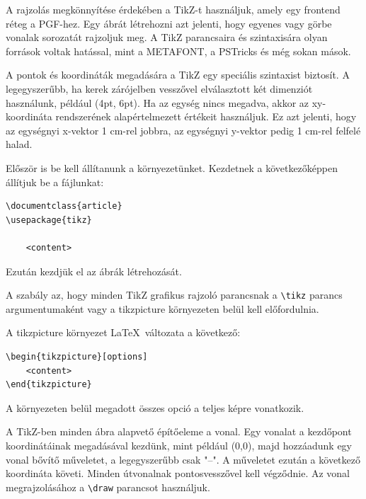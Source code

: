 


A rajzolás megkönnyítése érdekében a TikZ-t használjuk, amely egy frontend réteg a PGF-hez. Egy ábrát létrehozni azt jelenti, hogy egyenes vagy görbe vonalak sorozatát rajzoljuk meg. A TikZ parancsaira és szintaxisára olyan források voltak hatással, mint a METAFONT, a PSTricks és még sokan mások.

\noindent
A pontok és koordináták megadására a TikZ egy speciális szintaxist biztosít. A legegyszerűbb, ha kerek zárójelben vesszővel elválasztott két dimenziót használunk, például (4pt, 6pt). Ha az egység nincs megadva, akkor az xy-koordináta rendszerének alapértelmezett értékeit használjuk. Ez azt jelenti, hogy az egységnyi x-vektor 1 cm-rel jobbra, az egységnyi y-vektor pedig 1 cm-rel felfelé halad. 



Először is be kell állítanunk a környezetünket. Kezdetnek a következőképpen állítjuk be a fájlunkat:

\begin{lstlisting}[style=latex]
\documentclass{article}
\usepackage{tikz}

	<content>

\end{lstlisting}

\noindent
Ezután kezdjük el az ábrák létrehozását. 



A szabály az, hogy minden TikZ grafikus rajzoló parancsnak a \lstinline{\tikz} parancs argumentumaként vagy a {tikzpicture} környezeten belül kell előfordulnia. 

\noindent
A {tikzpicture} környezet \LaTeX\ változata a következő:

\begin{lstlisting}[style=latex]
\begin{tikzpicture}[options]
	<content>
\end{tikzpicture}
\end{lstlisting}


\noindent
A környezeten belül megadott összes opció a teljes képre vonatkozik.

\noindent
A TikZ-ben minden ábra alapvető építőeleme a vonal. Egy vonalat a kezdőpont koordinátáinak megadásával kezdünk, mint például (0,0), majd hozzáadunk egy vonal bővítő műveletet, a legegyszerűbb csak "--". A műveletet ezután a következő koordináta követi. Minden útvonalnak pontosvesszővel kell végződnie. Az vonal megrajzolásához a \lstinline{\draw} parancsot használjuk.

